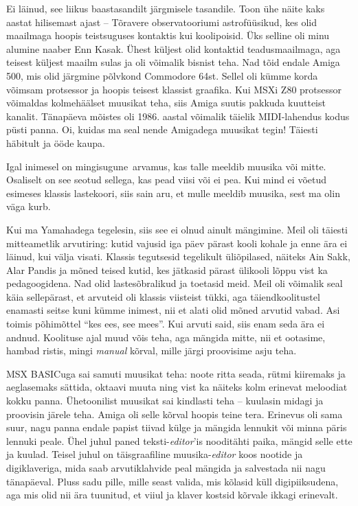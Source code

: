 Ei läinud, see liikus baastasandilt järgmisele tasandile. Toon ühe näite kaks aastat hilisemast ajast -- Tõravere observatooriumi 
astrofüüsikud, kes olid maailmaga hoopis teistsuguses kontaktis kui 
koolipoisid. Üks selline oli minu alumine naaber Enn 
Kasak. Ühest küljest olid kontaktid 
teadusmaailmaga, aga teisest küljest maailm sulas ja oli 
võimalik bisnist teha. Nad tõid endale Amiga 
500, mis olid 
järgmine põlvkond Commodore 64st. Sellel oli kümme 
korda võimsam protsessor ja hoopis teisest klassist graafika. 
Kui MSXi Z80 protsessor võimaldas kolmehäälset muusikat teha, siis Amiga 
suutis pakkuda kuutteist kanalit. Tänapäeva mõistes oli 1986. aastal võimalik täielik MIDI-lahendus kodus püsti panna. Oi, kuidas 
ma seal nende Amigadega muusikat tegin! Täiesti häbitult ja ööde kaupa.


Igal inimesel on mingisugune arvamus, kas talle meeldib muusika või mitte. Osaliselt on see seotud sellega, 
kas pead viisi või ei pea. Kui mind ei võetud esimeses klassis lastekoori, siis sain aru, et mulle meeldib muusika, sest ma olin väga kurb. 

Kui ma Yamahadega tegelesin, siis see ei olnud ainult mängimine. 
Meil oli täiesti mitteametlik arvutiring: 
kutid vajusid iga päev pärast kooli kohale ja enne ära ei läinud, kui välja 
visati. Klassis tegutsesid tegelikult 
üliõpilased, näiteks Ain Sakk, Alar Pandis ja mõned teised kutid, kes jätkasid pärast ülikooli lõppu vist ka pedagoogidena. Nad olid lastesõbralikud ja toetasid meid. Meil oli võimalik seal käia sellepärast, et
arvuteid oli klassis viisteist tükki, aga 
täiendkoolitustel enamasti seitse kuni kümme inimest, nii et 
alati olid mõned arvutid vabad. Asi toimis põhimõttel \enquote{kes ees, see mees}. Kui arvuti said, siis enam seda ära ei 
andnud. Koolituse ajal muud võis teha, aga mängida mitte, nii et ootasime, hambad ristis, mingi \emph{manual} 
kõrval, mille järgi proovisime asju teha. 

MSX BASICuga sai samuti muusikat teha: noote ritta seada, 
rütmi kiiremaks ja aeglasemaks sättida, oktaavi muuta ning vist ka näiteks 
kolm erinevat meloodiat kokku panna. Ühetoonilist muusikat sai 
kindlasti teha -- kuulasin midagi ja proovisin 
järele teha. Amiga oli selle kõrval hoopis teine tera.
Erinevus oli sama suur, nagu panna endale papist 
tiivad külge ja mängida lennukit või minna päris lennuki peale. 
Ühel juhul paned teksti-\emph{editor}'is nooditähti paika, mängid selle ette ja kuulad. Teisel juhul on täisgraafiline muusika-\emph{editor} koos nootide ja digiklaveriga, mida saab arvutiklahvide peal mängida ja salvestada nii nagu tänapäeval. Pluss sadu pille, mille seast valida, mis 
kõlasid küll digipiiksudena, aga mis olid nii ära tuunitud, et viiul ja klaver kostsid kõrvale ikkagi erinevalt.

